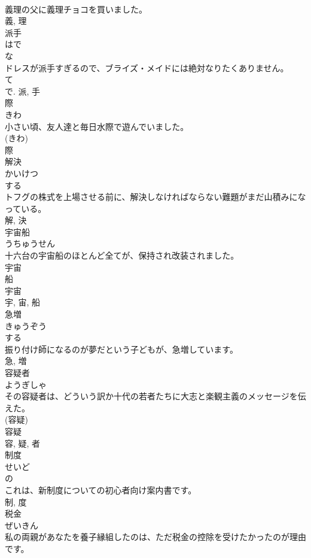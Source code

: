 \documentclass[8pt]{extreport}
\begin{document}
\begin{CJK}{UTF8}{min}
\\	義理の父に義理チョコを買いました。	
\\	義, 理	
\\	派手	
\\	はで	
\\	な 
\\	ドレスが派手すぎるので、ブライズ・メイドには絶対なりたくありません。	
\\	て 
\\	で.	派, 手	
\\	際	
\\	きわ	
\\	小さい頃、友人達と毎日水際で遊んでいました。	
\\	(きわ) 
\\	際	
\\	解決	
\\	かいけつ	
\\	する 
\\	トフグの株式を上場させる前に、解決しなければならない難題がまだ山積みになっている。	
\\	解, 決	
\\	宇宙船	
\\	うちゅうせん	
\\	十六台の宇宙船のほとんど全てが、保持され改装されました。	
\\	宇宙 
\\	船 
\\	宇宙 
\\	宇, 宙, 船	
\\	急増	
\\	きゅうぞう	
\\	する 
\\	振り付け師になるのが夢だという子どもが、急増しています。	
\\	急, 増	
\\	容疑者	
\\	ようぎしゃ	
\\	その容疑者は、どういう訳か十代の若者たちに大志と楽観主義のメッセージを伝えた。	
\\	(容疑) 
\\	容疑 
\\	容, 疑, 者	
\\	制度	
\\	せいど	
\\	の 
\\	これは、新制度についての初心者向け案内書です。	
\\	制, 度	
\\	税金	
\\	ぜいきん	
\\	私の両親があなたを養子縁組したのは、ただ税金の控除を受けたかったのが理由です。	

\end{CJK}
\end{document}
